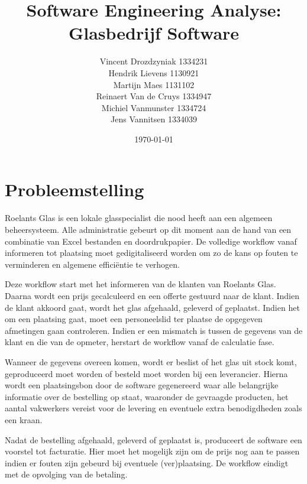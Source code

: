 \documentclass[a4paper]{article}
\title{Software Engineering Analyse: \\ Glasbedrijf Software}
\author{Vincent Drozdzyniak 1334231 \\ Hendrik Lievens 1130921 \\ Martijn Maes 1131102 \\ Reinaert Van de Cruys 1334947 \\ Michiel Vanmunster 1334724 \\ Jens Vannitsen 1334039}
\date{\today}
\begin{document}
\maketitle

\section{Probleemstelling}
Roelants Glas is een lokale glasspecialist die nood heeft aan een algemeen beheersysteem. Alle administratie gebeurt op dit moment aan de hand van een combinatie van Excel bestanden en doordrukpapier. De volledige workflow vanaf informeren tot plaatsing moet gedigitaliseerd worden om zo de kans op fouten te verminderen en algemene efficiëntie te verhogen.

Deze workflow start met het informeren van de klanten van Roelants Glas. Daarna wordt een prijs gecalculeerd en een offerte gestuurd naar de klant. Indien de klant akkoord gaat, wordt het glas afgehaald, geleverd of geplaatst. Indien het om een plaatsing gaat, moet een personeelslid ter plaatse de opgegeven afmetingen gaan controleren. Indien er een mismatch is tussen de gegevens van de klant en die van de opmeter, herstart de workflow vanaf de calculatie fase.

Wanneer de gegevens overeen komen, wordt er beslist of het glas uit stock komt, geproduceerd moet worden of besteld moet worden bij een leverancier. Hierna wordt een plaatsingsbon door de software gegenereerd waar alle belangrijke informatie over de bestelling op staat, waaronder de gevraagde producten, het aantal vakwerkers vereist voor de levering en eventuele extra benodigdheden zoals een kraan.

Nadat de bestelling afgehaald, geleverd of geplaatst is, produceert de software een voorstel tot facturatie. Hier moet het mogelijk zijn om de prijs nog aan te passen indien er fouten zijn gebeurd bij eventuele (ver)plaatsing. De workflow eindigt met de opvolging van de betaling.
\end{document}
